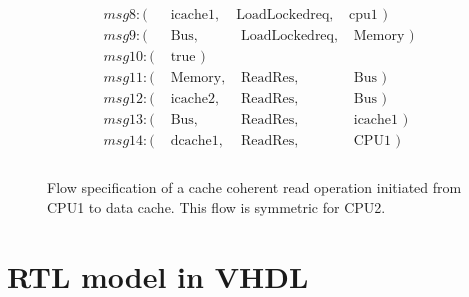 \documentclass[12pt,frontmatter,copyright,thesis]{usfmanus}
\begin{document}
\begin{appendix}
\begin{figure}[h]
\begin{minipage}{.5\textwidth}
 {\footnotesize
 \[
 \begin{array}{llll}
 msg8: (&\mbox{ icache1},&\mbox{LoadLockedreq},&\mbox{cpu1       })\\
 msg9: (&\mbox{ Bus},&\mbox{ LoadLockedreq},&\mbox{ Memory     })\\
 msg10: (&\mbox{ true })\\
 msg11: (&\mbox{ Memory},&\mbox{ ReadRes},&\mbox{ Bus       })\\     
 msg12: (&\mbox{ icache2},&\mbox{ ReadRes},&\mbox{ Bus    })\\
 msg13: (&\mbox{ Bus},&\mbox{ ReadRes},&\mbox{ icache1 })\\
 msg14: (&\mbox{ dcache1},&\mbox{ ReadRes},&\mbox{ CPU1 })\\\\
 \end{array}
 \]}
 \end{minipage}
 
 \caption{\footnotesize Flow specification of a cache coherent read operation initiated from CPU1 to  data cache. \footnotesize This flow is symmetric for CPU2. }
 \label{read-dcache} 
 \end{figure}
 \clearpage
 




\chapter{RTL model in VHDL}%

\end{appendix}
\end{document}
